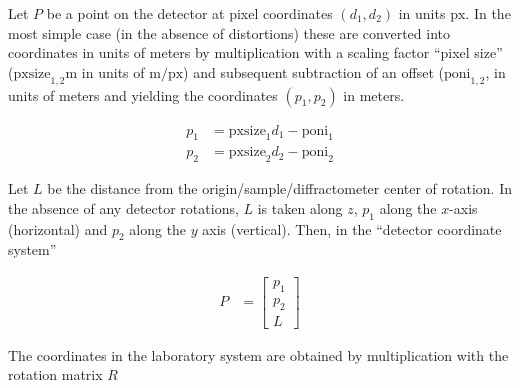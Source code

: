 \documentclass[12pt]{article}
\begin{document}
Let $P$ be a point on the detector at pixel coordinates $(d_1, d_2)$
in units $\mathrm{px}$. In the most simple case (in the absence of
distortions) these are converted into coordinates in units of meters
by multiplication with a scaling factor ``pixel size''
($\mathrm{pxsize}_{1,2}$m in units of $\mathrm{m}/\mathrm{px}$) and
subsequent subtraction of an offset ($\mathrm{poni}_{1,2}$, in units of
meters and yielding the coordinates $(p_1, p_2)$ in meters.

\begin{align}
  p_1 & = \mathrm{pxsize}_1 d_1 - \mathrm{poni}_1 \\
  p_2 & = \mathrm{pxsize}_2 d_2 - \mathrm{poni}_2
\end{align}

Let $L$ be the distance from the
origin/sample/diffractometer center of rotation. In the absence of any
detector rotations, $L$ is taken along $z$, $p_1$ along the $x$-axis
(horizontal) and $p_2$ along the $y$ axis (vertical). Then, in the
``detector coordinate system''

\begin{align}
  P & = \begin{bmatrix} p_1 \\ p_2 \\ L \end{bmatrix}
\end{align}

The coordinates in the laboratory system are obtained by
multiplication with the rotation matrix $R$
\end{document}
